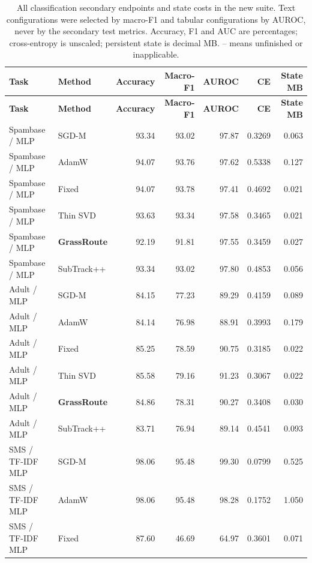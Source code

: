 {\scriptsize\setlength{\tabcolsep}{3pt}
\begin{longtable}{llrrrrr}
\caption{All classification secondary endpoints and state costs in the new suite. Text configurations were selected by macro-F1 and tabular configurations by AUROC, never by the secondary test metrics. Accuracy, F1 and AUC are percentages; cross-entropy is unscaled; persistent state is decimal MB. -- means unfinished or inapplicable.}\label{tab:newtasks-secondary}\\
\toprule {\bfseries Task} & {\bfseries Method} & {\bfseries Accuracy} & {\bfseries Macro-F1} & {\bfseries AUROC} & {\bfseries CE} & {\bfseries State MB}\\\midrule\endfirsthead
\toprule {\bfseries Task} & {\bfseries Method} & {\bfseries Accuracy} & {\bfseries Macro-F1} & {\bfseries AUROC} & {\bfseries CE} & {\bfseries State MB}\\\midrule\endhead
Spambase / MLP & SGD-M & 93.34 & 93.02 & 97.87 & 0.3269 & 0.063\\
Spambase / MLP & AdamW & 94.07 & 93.76 & 97.62 & 0.5338 & 0.127\\
Spambase / MLP & Fixed & 94.07 & 93.78 & 97.41 & 0.4692 & 0.021\\
Spambase / MLP & Thin SVD & 93.63 & 93.34 & 97.58 & 0.3465 & 0.021\\
\rowcolor{oursbg}Spambase / MLP & \textbf{GrassRoute} & 92.19 & 91.81 & 97.55 & 0.3459 & 0.027\\
Spambase / MLP & SubTrack++ & 93.34 & 93.02 & 97.80 & 0.4853 & 0.056\\
Adult / MLP & SGD-M & 84.15 & 77.23 & 89.29 & 0.4159 & 0.089\\
Adult / MLP & AdamW & 84.14 & 76.98 & 88.91 & 0.3993 & 0.179\\
Adult / MLP & Fixed & 85.25 & 78.59 & 90.75 & 0.3185 & 0.022\\
Adult / MLP & Thin SVD & 85.58 & 79.16 & 91.23 & 0.3067 & 0.022\\
\rowcolor{oursbg}Adult / MLP & \textbf{GrassRoute} & 84.86 & 78.31 & 90.27 & 0.3408 & 0.030\\
Adult / MLP & SubTrack++ & 83.71 & 76.94 & 89.14 & 0.4541 & 0.093\\
SMS / TF-IDF MLP & SGD-M & 98.06 & 95.48 & 99.30 & 0.0799 & 0.525\\
SMS / TF-IDF MLP & AdamW & 98.06 & 95.48 & 98.28 & 0.1752 & 1.050\\
SMS / TF-IDF MLP & Fixed & 87.60 & 46.69 & 64.97 & 0.3601 & 0.071\\

\end{longtable}}
